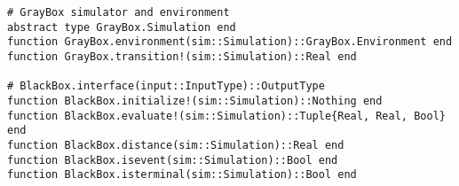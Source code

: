 \begin{lstlisting}[language=JuliaLocal]
# GrayBox simulator and environment
abstract type GrayBox.Simulation end
function GrayBox.environment(sim::Simulation)::GrayBox.Environment end
function GrayBox.transition!(sim::Simulation)::Real end

# BlackBox.interface(input::InputType)::OutputType
function BlackBox.initialize!(sim::Simulation)::Nothing end
function BlackBox.evaluate!(sim::Simulation)::Tuple{Real, Real, Bool} end
function BlackBox.distance(sim::Simulation)::Real end
function BlackBox.isevent(sim::Simulation)::Bool end
function BlackBox.isterminal(sim::Simulation)::Bool end
\end{lstlisting}
